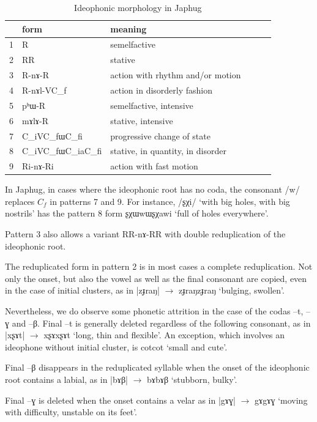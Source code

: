 \documentclass[oldfontcommands,oneside,a4paper,11pt]{article}
\newcommand{\ipa}[1]{{\phon \mbox{#1}}} %
\begin{document}
\begin{table}[h]
\caption{Ideophonic morphology in Japhug} \label{tab:ideo.morpho1}
\begin{tabular}{llllll}
\toprule
&form & meaning  \\
\midrule
1&R& semelfactive \\
2&RR& stative \\
3&R-\ipa{nɤ}-R& action with rhythm and/or motion \\
4&R-\ipa{nɤl}-VC_f &   action in disorderly fashion \\
5&\ipa{pʰɯ}-R&semelfactive, intensive \\
6&\ipa{mɤlɤ}-R&stative, intensive \\
7&C_iVC_f\ipa{ɯ}C_f\ipa{i}&progressive change of state  \\
8&C_iVC_f\ipa{ɯ}C_i\ipa{a}C_f\ipa{i} &  stative, in quantity, in disorder\\
9&R\ipa{i}-\ipa{nɤ}-R\ipa{i}& action with fast motion \\
\bottomrule
\end{tabular}
\end{table}

In Japhug, in cases where the ideophonic root has no coda, the consonant /\ipa{w}/ replaces $C_f$ in patterns 7 and 9. For instance, /\ipa{ʂχi}/ `with big holes, with big nostrils' has the pattern 8 form \ipa{ʂχɯwɯʂχawi} `full of holes everywhere'.

Pattern 3 also allows a variant RR-\ipa{nɤ}-RR with double reduplication of the ideophonic root.


The reduplicated form  in pattern 2 is in most cases a complete reduplication. Not only the onset, but also the vowel as well as the final consonant are copied, even in the case of initial clusters, as in |\ipa{zɟraŋ}| $\rightarrow$ \ipa{zɟraŋzɟraŋ} `bulging, swollen'. 

Nevertheless, we do observe some phonetic attrition in the case of  the codas \ipa{--t}, \ipa{--ɣ} and \ipa{--β}. Final \ipa{--t} is generally deleted regardless of the following consonant, as in  |\ipa{xʂɤt}| $\rightarrow$ \ipa{xʂɤxʂɤt} `long, thin and flexible'. An exception, which involves an ideophone without initial cluster, is \ipa{cotcot} `small and cute'.

Final \ipa{--β} disappears in the reduplicated syllable when the onset of the ideophonic root contains a labial, as in |\ipa{bɤβ}| $\rightarrow$  \ipa{bɤbɤβ} `stubborn, bulky'.


 Final \ipa{--ɣ} is  deleted when the onset contains a velar as in |\ipa{gɤɣ}| $\rightarrow$ \ipa{gɤgɤɣ} `moving with difficulty, unstable on its feet'. 
\end{document}
